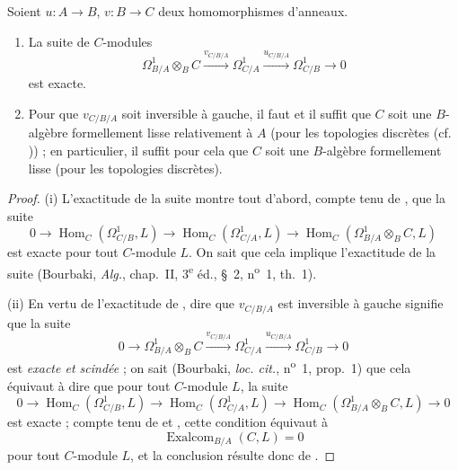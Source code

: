 \begin{theorem}[20.5.7]
\label{0.20.5.7-fr}
Soient $u:A\to B$, $v:B\to C$ deux homomorphismes d'anneaux.
\begin{enumerate}
  \item[\rm(i)] La suite de $C$-modules
\begin{equation}
\tag{20.5.7.1}
\label{0.20.5.7.1-fr}
  \Omega^1_{B/A}\otimes_B C
  \xrightarrow{v_{C/B/A}}\Omega^1_{C/A}
  \xrightarrow{u_{C/B/A}}\Omega^1_{C/B}\to0
\end{equation}
est exacte.
  \item[\rm(ii)] Pour que $v_{C/B/A}$ soit inversible à gauche, il faut et
  il suffit que $C$ soit une $B$-algèbre formellement lisse relativement à
  $A$ (pour les topologies discrètes (cf. )) ; en
  particulier, il suffit pour cela que $C$ soit une $B$-algèbre formellement
  lisse (pour les topologies discrètes).
\end{enumerate}
\end{theorem}

\begin{proof}
(i) L'exactitude de la suite  montre tout d'abord,
compte tenu de , que la suite
\[
  0\to\operatorname{Hom}_C(\Omega^1_{C/B},L)
  \to\operatorname{Hom}_C(\Omega^1_{C/A},L)
  \to\operatorname{Hom}_C(\Omega^1_{B/A}\otimes_B C,L)
\]
est exacte pour tout $C$-module $L$. On sait que cela implique l'exactitude
de la suite  (Bourbaki, \emph{Alg.}, chap.~II,
3\textsuperscript{e} éd., §~2, n\textsuperscript{o}~1, th.~1).

(ii) En vertu de l'exactitude de , dire que
$v_{C/B/A}$ est inversible à gauche signifie que la suite
\begin{equation}
\tag{20.5.7.2}
\label{0.20.5.7.2-fr}
  0\to\Omega^1_{B/A}\otimes_B C
  \xrightarrow{v_{C/B/A}}\Omega^1_{C/A}
  \xrightarrow{u_{C/B/A}}\Omega^1_{C/B}\to0
\end{equation}
est \emph{exacte et scindée} ; on sait (Bourbaki, \emph{loc. cit.},
n\textsuperscript{o}~1, prop.~1) que cela équivaut à dire que pour tout
$C$-module $L$, la suite
\[
  0\to\operatorname{Hom}_C(\Omega^1_{C/B},L)
  \to\operatorname{Hom}_C(\Omega^1_{C/A},L)
  \to\operatorname{Hom}_C(\Omega^1_{B/A}\otimes_B C,L)\to0
\]
est exacte ; compte tenu de  et
, cette condition équivaut à
\[
  \operatorname{Exalcom}_{B/A}(C,L)=0
\]
pour tout $C$-module $L$, et la conclusion résulte donc de
.
\end{proof}

